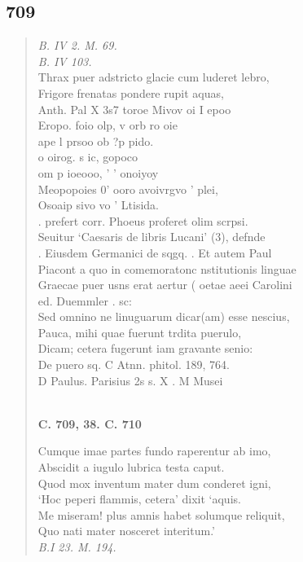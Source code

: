 \documentclass[11pt, a4paper]{report}
\begin{document}
            \subsection*{709}
      \begin{verse}
      \textit{B. IV 2. M. 69.} \\ \textit{B. IV 103.} \\ Thrax puer adstricto glacie cum luderet lebro, \\ Frigore frenatas pondere rupit aquas, \\ Anth. Pal X 3s7 toroe Mivov oi I epoo \\ Eropo. foio olp, v orb ro oie \\ ape l prsoo ob ?p pido. \\ o oirog. s ic, gopoco \\ om p ioeooo, ’ ’ onoiyoy \\ Meopopoies 0’ ooro avoivrgvo ’ plei, \\ Osoaip sivo vo ’ Ltisida. \\ . prefert corr. Phoeus proferet olim scrpsi. \\ Seuitur ‘Caesaris de libris Lucani’ (3), defnde \\ . Eiusdem Germanici de sqgq. . Et autem Paul \\ Piacont a quo in comemoratonc nstitutionis linguae \\ Graecae puer usns erat aertur ( oetae aeei Carolini \\ ed. Duemmler . sc: \\ Sed omnino ne linuguarum dicar(am) esse nescius, \\ Pauca, mihi quae fuerunt trdita puerulo, \\ Dicam; cetera fugerunt iam gravante senio: \\ De puero sq. C Atnn. phitol. 189, 764. \\ D Paulus. Parisius 2s s. X . M Musei \\ 
        ﻿\pagebreak 
    \begin{center} \textbf{C. 709, 38. C. 710} \end{center} \marginpar{[175]} Cumque imae partes fundo raperentur ab imo, \\ Abscidit a iugulo lubrica testa caput. \\ Quod mox inventum mater dum conderet igni, \\ ‘Hoc peperi flammis, cetera’ dixit ‘aquis. \\ Me miseram! plus amnis habet solumque reliquit, \\ Quo nati mater nosceret interitum.’ \\ \textit{B.I 23. M. 194.} \\ 
      \end{verse}
  
\end{document}
